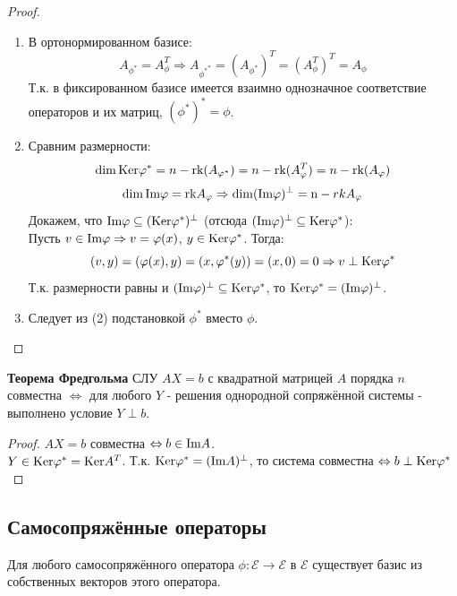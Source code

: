 \begin{proof}
    \begin{enumerate}
        \item В ортонормированном базисе:
        $$A_{\phi^{*}} = A_{\phi}^T \Rightarrow A_{{\phi^{*}}^{*}} = (A_{\phi^{*}})^T = (A_{\phi}^T)^T = A_{\phi}$$
        Т.к. в фиксированном базисе имеется взаимно однозначное соответствие операторов и их матриц, $(\phi^{*})^{*} = \phi$.
        \item Сравним размерности:
        $$\dim \textup{Ker}\phi^{*} = n - \textup{rk}(A_{\phi^{*}}) = n - \textup{rk}(A_{\phi}^T) = n - \textup{rk}(A_{\phi})$$
        $$\dim \textup{Im}\phi = \textup{rk} A_{\phi} \Rightarrow \dim (\textup{Im}\phi)^{\perp} = \textup n - {rk} A_{\phi}$$
        Докажем, что $\textup{Im}\phi \subseteq (\textup{Ker}\phi^{*})^{\perp}$  (отсюда $(\textup{Im}\phi)^{\perp} \subseteq \textup{Ker}\phi^{*}$):\\
        Пусть $v \in \textup{Im}\phi \Rightarrow v = \phi(x)$, $y \in \textup{Ker}\phi^{*}$. Тогда:
        $$(v, y) = (\phi(x), y) = (x, \phi^{*}(y)) = (x, 0) = 0 \Rightarrow v \perp \textup{Ker}\phi^{*}$$
        Т.к. размерности равны и $(\textup{Im}\phi)^{\perp} \subseteq \textup{Ker}\phi^{*}$, то $\textup{Ker}\phi^{*} = (\textup{Im}\phi)^{\perp}$.
        \item Следует из (2) подстановкой $\phi^{*}$ вместо $\phi$.
    \end{enumerate}
\end{proof}
\begin{consequense}\textbf{Теорема Фредгольма}
    СЛУ $AX = b$ с квадратной матрицей $A$ порядка $n$ совместна $\Leftrightarrow$ для любого $Y$ - решения однородной сопряжённой системы - выполнено условие $Y \perp b$. 
\end{consequense}
\begin{proof}
    $AX = b$ совместна $\Leftrightarrow b \in \textup{Im}A$.\\
    $Y \in \textup{Ker}\phi^{*} = \textup{Ker}A^T$. Т.к. $\textup{Ker}\phi^{*} = (\textup{Im}A)^\perp$, то система совместна $\Leftrightarrow b \perp \textup{Ker}\phi^{*}$  
\end{proof}
\subsection{Самосопряжённые операторы}
\begin{theorem}
    Для любого самосопряжённого оператора $\phi: \mathcal{E} \rightarrow \mathcal{E}$ в $\mathcal{E}$ существует базис из собственных векторов этого оператора.
\end{theorem}